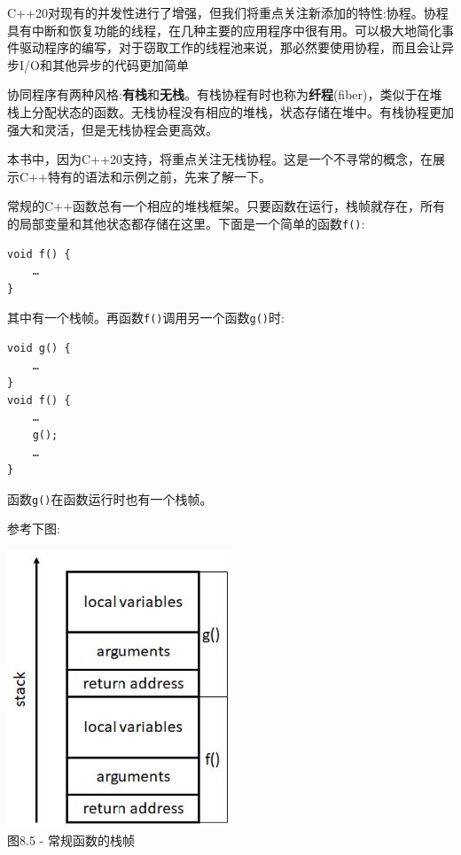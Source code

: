 
C++20对现有的并发性进行了增强，但我们将重点关注新添加的特性:协程。协程具有中断和恢复功能的线程，在几种主要的应用程序中很有用。可以极大地简化事件驱动程序的编写，对于窃取工作的线程池来说，那必然要使用协程，而且会让异步I/O和其他异步的代码更加简单


协同程序有两种风格:\textbf{有栈}和\textbf{无栈}。有栈协程有时也称为\textbf{纤程}(fiber)，类似于在堆栈上分配状态的函数。无栈协程没有相应的堆栈，状态存储在堆中。有栈协程更加强大和灵活，但是无栈协程会更高效。

本书中，因为C++20支持，将重点关注无栈协程。这是一个不寻常的概念，在展示C++特有的语法和示例之前，先来了解一下。

常规的C++函数总有一个相应的堆栈框架。只要函数在运行，栈帧就存在，所有的局部变量和其他状态都存储在这里。下面是一个简单的函数\texttt{f()}:

\begin{lstlisting}[style=styleCXX]
void f() {
	…
}
\end{lstlisting}

其中有一个栈帧。再函数\texttt{f()}调用另一个函数\texttt{g()}时:

\begin{lstlisting}[style=styleCXX]
void g() {
	…
}
void f() {
	…
	g();
	…
}
\end{lstlisting}

函数\texttt{g()}在函数运行时也有一个栈帧。 

参考下图:

\begin{center}
\includegraphics[width=0.5\textwidth]{content/2/chapter8/images/5.jpg}\\
图8.5 - 常规函数的栈帧
\end{center}

